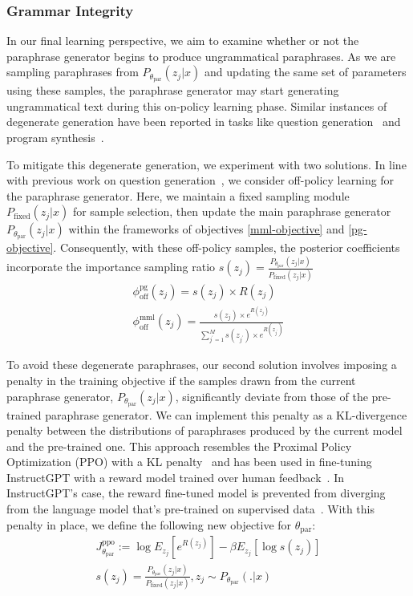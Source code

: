 \documentclass[11pt]{article}
\begin{document}
\subsubsection{Grammar Integrity}
In our final learning perspective, we aim to examine whether or not the paraphrase generator begins to produce ungrammatical paraphrases. As we are sampling paraphrases from $P_{\theta_{\text{par}}}(z_{j}|x)$ and updating the same set of parameters using these samples, the paraphrase generator may start generating ungrammatical text during this on-policy learning phase. Similar instances of degenerate generation have been reported in tasks like question generation~\cite{najafi-fyshe-2023-weakly} and program synthesis~\cite{NEURIPS2018_f4e369c0}.

To mitigate this degenerate generation, we experiment with two solutions. In line with previous work on question generation~\cite{najafi-fyshe-2023-weakly}, we consider off-policy learning for the paraphrase generator. Here, we maintain a fixed sampling module $P_{\text{fixed}}(z_{j}|x)$ for sample selection, then update the main paraphrase generator $P_{\theta_{\text{par}}}(z_{j}|x)$ within the frameworks of objectives \ref{mml-objective} and \ref{pg-objective}. Consequently, with these off-policy samples, the posterior coefficients incorporate the importance sampling ratio $s(z_{j}) = \frac{P_{\theta_{\text{par}}}(z_{j}|x)}{P_{\text{fixed}}(z_{j}|x)}$
\begin{multline}
\phi^{\text{pg}}_{\text{off}}(z_{j}) = s(z_{j}) \times R(z_{j})\\
\phi^{\text{mml}}_{\text{off}}(z_{j}) = \frac{s(z_{j}) \times e^{R(z_{j})}}{\sum^{M}_{j^{'}=1} s(z_{j^{'}}) \times e^{R(z_{j^{'}})}}
\label{off-pg-mml-objective}
\end{multline}

To avoid these degenerate paraphrases, our second solution involves imposing a penalty in the training objective if the samples drawn from the current paraphrase generator, $P_{\theta_{\text{par}}}(z_{j}|x)$, significantly deviate from those of the pre-trained paraphrase generator. We can implement this penalty as a KL-divergence penalty between the distributions of paraphrases produced by the current model and the pre-trained one. This approach resembles the Proximal Policy Optimization (PPO) with a KL penalty~\cite{DBLP:journals/corr/SchulmanWDRK17} and has been used in fine-tuning InstructGPT with a reward model trained over human feedback~\cite{ouyang2022training}. In InstructGPT's case, the reward fine-tuned model is prevented from diverging from the language model that's pre-trained on supervised data~\cite{ouyang2022training}. With this penalty in place, we define the following new objective for $\theta_{\text{par}}$:
\begin{multline}
J^{\text{ppo}}_{\theta_{\text{par}}}
:= \log E_{z_{j}} [e^{R(z_{j})}] - \beta E_{z_{j}} [\log s(z_j)] \\
s(z_{j}) = \frac{P_{\theta_{\text{par}}}(z_{j}|x)}{P_{\text{fixed}}
(z_{j}|x)}, z_{j} \sim P_{\theta_{\text{par}}}(.|x)
\label{lmfp-expect-ppo-objective}
\end{multline}
\end{document}
